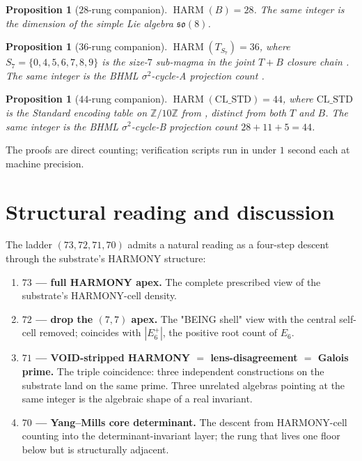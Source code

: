 \documentclass[11pt,reqno]{amsart}
\newtheorem{proposition}[theorem]{Proposition}
\theoremstyle{definition}
\newcommand{\Z}{\mathbb{Z}}
\DeclareMathOperator{\HARM}{HARM}
\begin{document}
\begin{proposition}[$28$-rung companion]
\label{prop:28}
$\HARM(B) = 28$. The same integer is the dimension of the simple Lie
algebra $\mathfrak{so}(8)$.
\end{proposition}

\begin{proposition}[$36$-rung companion]
\label{prop:36}
$\HARM(T_{S_7}) = 36$, where $S_7 = \{0, 4, 5, 6, 7, 8, 9\}$ is the
size-$7$ sub-magma in the joint $T+B$ closure chain
\cite{Sanders2026FourCore}. The same integer is the BHML
$\sigma^2$-cycle-A projection count
\cite{Sanders2026LensInvariance}.
\end{proposition}

\begin{proposition}[$44$-rung companion]
\label{prop:44}
$\HARM(\mathrm{CL\_STD}) = 44$, where $\mathrm{CL\_STD}$ is the
Standard encoding table on $\Z/10\Z$ from
\cite{Sanders2026LensInvariance}, distinct from both $T$ and $B$.
The same integer is the BHML $\sigma^2$-cycle-B projection count
$28 + 11 + 5 = 44$.
\end{proposition}

The proofs are direct counting; verification scripts run in under
$1$ second each at machine precision.

\section{Structural reading and discussion}
\label{sec:reading}

The ladder $(73, 72, 71, 70)$ admits a natural reading as a four-step
descent through the substrate's HARMONY structure:

\begin{enumerate}[label=(\arabic*),leftmargin=*]
\item \textbf{$73$ — full HARMONY apex.} The complete prescribed view
  of the substrate's HARMONY-cell density.
\item \textbf{$72$ — drop the $(7,7)$ apex.} The "BEING shell" view
  with the central self-cell removed; coincides with $|E_6^+|$, the
  positive root count of $E_6$.
\item \textbf{$71$ — VOID-stripped HARMONY $=$ lens-disagreement $=$
  Galois prime.} The triple coincidence: three independent
  constructions on the substrate land on the same prime. Three
  unrelated algebras pointing at the same integer is the algebraic
  shape of a real invariant.
\item \textbf{$70$ — Yang--Mills core determinant.} The descent from
  HARMONY-cell counting into the determinant-invariant layer; the
  rung that lives one floor below but is structurally adjacent.
\end{enumerate}
\end{document}
